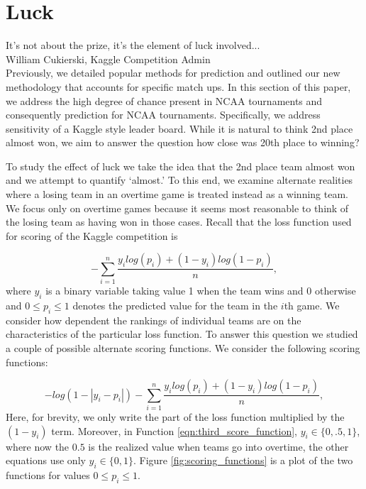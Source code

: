 
\section{Luck}
\noindent It's not about the prize, it's the element of luck involved...\\
\noindent  William Cukierski, Kaggle Competition Admin \\

Previously, we detailed popular methods for prediction and outlined our new methodology that accounts for specific match ups. In this section of this paper, we address the high degree of chance present in NCAA tournaments and consequently prediction for NCAA tournaments.  Specifically, we address sensitivity of a Kaggle style leader board. While it is natural to think 2nd place almost won, we aim to answer the question how close was 20th place to winning? 


To study the effect of luck we take the idea that the 2nd place team almost won and we attempt to quantify `almost.' To this end, we examine alternate realities where a losing team in an overtime game is treated instead as a winning team. We focus only on overtime games because it seems most reasonable to think of the losing team as having won in those cases. Recall that the loss function used for scoring of the Kaggle competition is


\begin{equation}\label{eqn:kaggle_score}
-\sum_{i=1}^n\frac{y_ilog(p_i)+ (1-y_i)log(1-p_i)}{n},
\end{equation}
where $y_i$ is a binary variable taking value 1 when the team wins and 0 otherwise and $0 \leq p_i \leq 1$ denotes the predicted value for the team in the $i$th game. We consider how dependent the rankings of individual teams are on the characteristics of the particular loss function. To answer this question we studied a couple of possible alternate scoring functions. We consider the following scoring functions: 
 


\begin{equation}\label{eqn:third_score_function}
-log(1-|y_i-p_i|)  -\sum_{i=1}^n\frac{y_ilog(p_i)+ (1-y_i)log(1-p_i)}{n},
\end{equation} 
Here, for brevity, we only write the part of the loss function multiplied by the $(1-y_i)$ term. Moreover, in Function \ref{eqn:third_score_function}, $y_i \in \{0,.5,1\}$, where now the $0.5$ is the realized value when teams go into overtime, the other equations use only $y_i \in \{0,1\}$. Figure \ref{fig:scoring_functions} is a plot of the two functions for values $0\leq p_i \leq 1$.  

